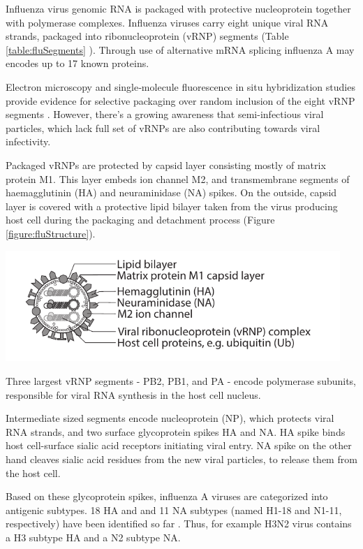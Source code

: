 Influenza virus genomic RNA is packaged with protective nucleoprotein together with polymerase complexes. Influenza viruses carry eight unique viral RNA strands, packaged into ribonucleoprotein  (vRNP) segments (Table \ref{table:fluSegments} \cite{das2010structures, dubois2014influenza}). Through use of alternative mRNA splicing influenza A may encodes up to 17 known proteins.

Electron microscopy and single‑molecule fluorescence in situ hybridization studies provide evidence for selective packaging over random inclusion of the eight vRNP segments \cite{eisfeld2015centre}. However, there's a growing awareness that semi-infectious viral particles, which lack full set of vRNPs are also contributing towards viral infectivity.

Packaged vRNPs are protected by capsid layer consisting mostly of matrix protein M1. This layer embeds ion channel M2, and transmembrane segments of haemagglutinin (HA) and neuraminidase (NA) spikes. On the outside, capsid layer is covered with a protective lipid bilayer taken from the virus producing host cell during the packaging and detachment process (Figure \ref{figure:fluStructure}).

\begin{center}
\includegraphics[width=0.95\textwidth, trim={0cm 0cm 0cm 0cm}, clip]{D_chapters/0_introduction/flu_structure.pdf}
\label{figure:fluStructure}
\end{center}

Three largest vRNP segments - PB2, PB1, and PA - encode polymerase subunits, responsible for viral RNA synthesis in the host cell nucleus.

Intermediate sized segments encode nucleoprotein (NP), which protects viral RNA strands, and two surface glycoprotein spikes HA and NA. HA spike binds host cell-surface sialic acid receptors initiating viral entry. NA spike on the other hand cleaves sialic acid residues from the new viral particles, to release them from the host cell.

Based on these glycoprotein spikes, influenza A viruses are categorized into antigenic subtypes. 18 HA and and 11 NA subtypes (named H1-18 and N1-11, respectively) have been identified so far \cite{InfluenzaAAntigenicSubtypes}. Thus, for example H3N2 virus contains a H3 subtype HA and a N2 subtype NA.

